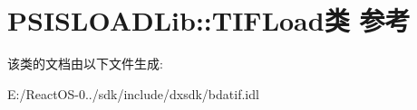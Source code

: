 \hypertarget{class_p_s_i_s_l_o_a_d_lib_1_1_t_i_f_load}{}\section{P\+S\+I\+S\+L\+O\+A\+D\+Lib\+:\+:T\+I\+F\+Load类 参考}
\label{class_p_s_i_s_l_o_a_d_lib_1_1_t_i_f_load}


该类的文档由以下文件生成\+:\begin{DoxyCompactItemize}
\item 
E\+:/\+React\+O\+S-\/0../sdk/include/dxsdk/bdatif.\+idl\end{DoxyCompactItemize}

